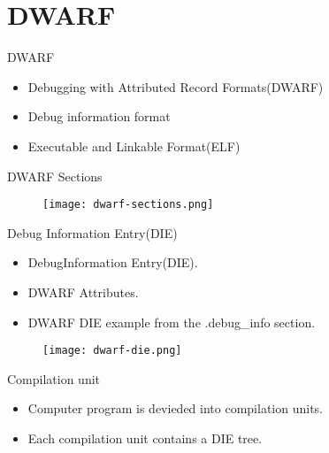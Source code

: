 \section{DWARF}

\begin{frame}{DWARF}
    \begin{itemize}
	    \item Debugging with Attributed Record Formats(DWARF)
	    \item Debug information format
	    \item Executable and Linkable Format(ELF)
    \end{itemize}
\end{frame}


\begin{frame}{DWARF Sections}
	\begin{figure}
		\texttt{[image: dwarf-sections.png]}
	\end{figure}
\end{frame}


\begin{frame}{Debug Information Entry(DIE)}
	\begin{itemize}
	    \item DebugInformation Entry(DIE).
	    \item DWARF Attributes.
	    \item DWARF DIE example from the .debug\_info section.
	\end{itemize}
	\begin{figure}
		\texttt{[image: dwarf-die.png]}
	\end{figure}
\end{frame}


\begin{frame}{Compilation unit}
	\begin{itemize}
		\item Computer program is devieded into compilation units.
		\item Each compilation unit contains a DIE tree.
	\end{itemize}
\end{frame}

